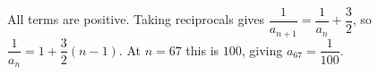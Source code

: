 All terms are positive. Taking reciprocals gives $\dfrac{1}{a_{n+1}}=\dfrac{1}{a_n}+\dfrac{3}{2}$, so $\dfrac{1}{a_n}=1+\dfrac{3}{2}(n-1)$. At $n=67$ this is $100$, giving $\boxed{a_{67}=\dfrac{1}{100}}$.
